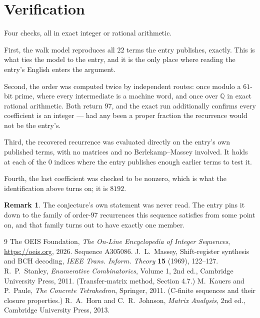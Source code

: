 \documentclass[11pt,a4paper]{article}
\theoremstyle{plain}
\theoremstyle{definition}
\newtheorem{remark}[theorem]{Remark}
\begin{document}
\section{Verification}

Four checks, all in exact integer or rational arithmetic.

First, the walk model reproduces all $22$ terms the entry publishes, exactly. This is
what ties the model to the entry, and it is the only place where reading the entry's English
enters the argument.

Second, the order was computed twice by independent routes: once modulo a $61$-bit prime, where
every intermediate is a machine word, and once over $\mathbb{Q}$ in exact rational arithmetic.
Both return $97$, and the exact run additionally confirms every coefficient is an integer
--- had any been a proper fraction the recurrence would not be the entry's.

Third, the recovered recurrence was evaluated directly on the entry's own published terms, with
no matrices and no Berlekamp--Massey involved. It holds at each of the $0$ indices where
the entry publishes enough earlier terms to test it.

Fourth, the last coefficient was checked to be nonzero, which is what the identification above
turns on; it is $8192$.

\begin{remark}
The conjecture's own statement was never read. The entry pins it down to the family of
order-$97$ recurrences this sequence satisfies from some point on, and that family turns
out to have exactly one member.
\end{remark}

\begin{thebibliography}{9}
 The OEIS Foundation, \emph{The On-Line Encyclopedia of Integer
Sequences}, \url{https://oeis.org}, 2026. Sequence A305086.
 J.~L.~Massey, Shift-register synthesis and BCH decoding, \emph{IEEE
Trans. Inform. Theory} \textbf{15} (1969), 122--127.
 R.~P.~Stanley, \emph{Enumerative Combinatorics}, Volume 1, 2nd ed.,
Cambridge University Press, 2011. (Transfer-matrix method, Section 4.7.)
 M.~Kauers and P.~Paule, \emph{The Concrete Tetrahedron}, Springer, 2011.
(C-finite sequences and their closure properties.)
 R.~A.~Horn and C.~R.~Johnson, \emph{Matrix Analysis}, 2nd ed., Cambridge
University Press, 2013.
\end{thebibliography}
\end{document}
